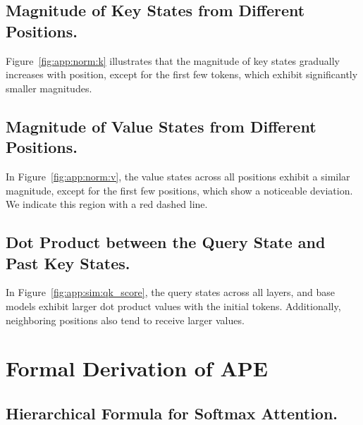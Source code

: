

\subsection{Magnitude of Key States from Different Positions.}

Figure~\ref{fig:app:norm:k} illustrates that the magnitude of key states gradually increases with position, except for the first few tokens, which exhibit significantly smaller magnitudes.



\subsection{Magnitude of Value States from Different Positions.}



In Figure~\ref{fig:app:norm:v}, the value states across all positions exhibit a similar magnitude, except for the first few positions, which show a noticeable deviation. We indicate this region with a red dashed line.

\subsection{Dot Product between the Query State and Past Key States.}



In Figure~\ref{fig:app:sim:qk_score}, the query states across all layers, and base models exhibit larger dot product values with the initial tokens. Additionally, neighboring positions also tend to receive larger values.

\section{Formal Derivation of APE}
\label{app:algorithm}

\subsection{Hierarchical Formula for Softmax Attention.}


